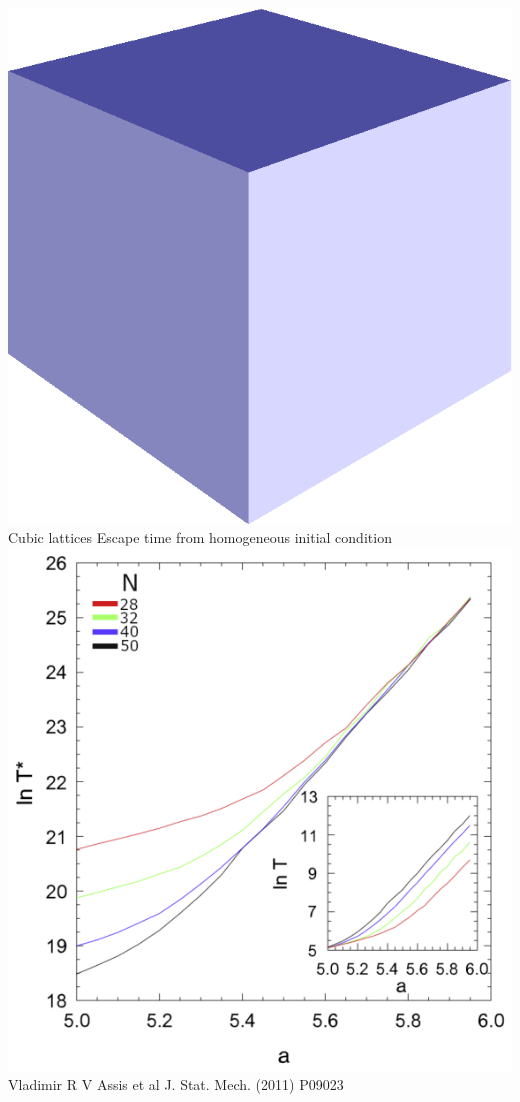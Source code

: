 \documentclass[serif,mathserif]{beamer}
\begin{document}
\begin{frame}{\includegraphics[height=0.06\textheight]{cube.eps}\hspace{0.25cm} Cubic lattices}
    \centering
    Escape time from homogeneous initial condition\\
    \vspace{0.4cm}
    \includegraphics[height=0.75\textheight]{escapetime.eps}\\
    Vladimir R V Assis et al J. Stat. Mech. (2011) P09023
\end{frame}
\end{document}
